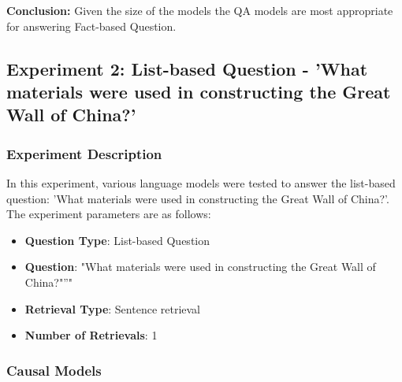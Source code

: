 \documentclass{wseas}
\begin{document}
\textbf{Conclusion:}
Given the size of the models the QA models are most
appropriate for answering Fact-based Question.


\subsection{Experiment 2: List-based Question - 'What materials were
used in constructing the Great Wall of China?'}

\subsubsection{Experiment Description}

In this experiment, various language models were tested to answer the
list-based question: 'What materials were used in constructing the
Great Wall of China?'. The experiment parameters are as follows:

\begin{itemize}
\item
  \textbf{Question Type}: List-based Question
\item
  \textbf{Question}: "What materials were used in constructing the Great Wall of China?"''"
\item
  \textbf{Retrieval Type}: Sentence retrieval
\item
  \textbf{Number of Retrievals}: 1
\end{itemize}

\subsubsection{Causal Models}

\end{document}
